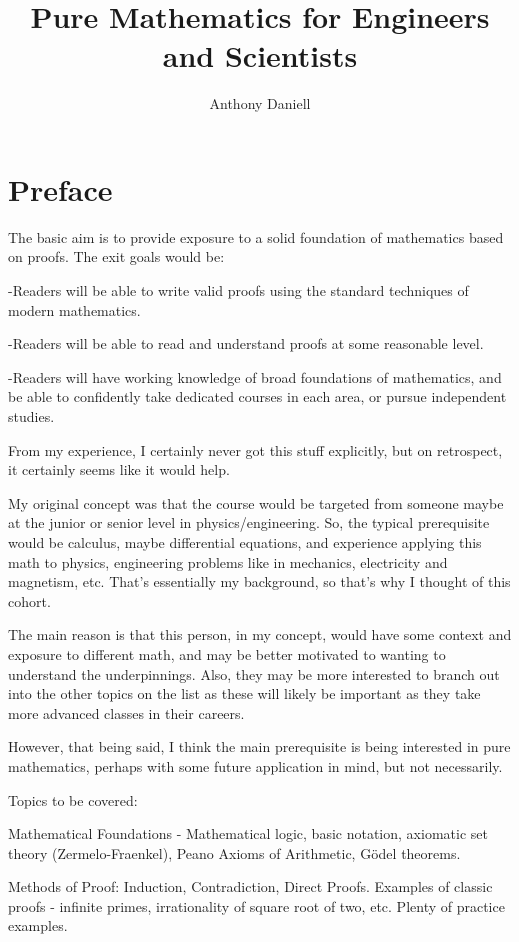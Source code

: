 \documentclass{book}
\title{Pure Mathematics for Engineers and Scientists}
\author{Anthony Daniell}
\begin{document}
\maketitle 


\chapter*{Preface}


The basic aim is to provide exposure to a solid foundation of mathematics based on proofs.  The exit goals would be:

-Readers will be able to write valid proofs using the standard techniques of modern mathematics.

-Readers will be able to read and understand proofs at some reasonable level.

-Readers will have working knowledge of broad foundations of mathematics, and be able to confidently take dedicated courses in each area, or pursue independent studies.
    
    
From my experience, I certainly never got this stuff explicitly, but on retrospect, it certainly seems like it would help.     


My original concept was that the course would be targeted from someone maybe at the junior or senior level in physics/engineering.  So, the typical prerequisite would be calculus, maybe differential equations, and experience applying this math to physics, engineering problems like in mechanics, electricity and magnetism, etc.  That's essentially my background, so that's why I thought of this cohort.

The main reason is that this person, in my concept, would have some context and exposure to different math, and may be better motivated to wanting to understand the underpinnings.  Also, they may be more interested to branch out into the other topics on the list as these will likely be important as they take more advanced classes in their careers.

However, that being said, I think the main prerequisite is being interested in pure mathematics, perhaps with some future application in mind, but not necessarily.


Topics to be covered:

    Mathematical Foundations - Mathematical logic, basic notation, axiomatic set theory (Zermelo-Fraenkel), Peano Axioms of Arithmetic, G{\"o}del theorems.


    Methods of Proof:  Induction, Contradiction, Direct Proofs.  Examples of classic proofs - infinite primes, irrationality of square root of two, etc.  Plenty of practice examples.
\end{document}
